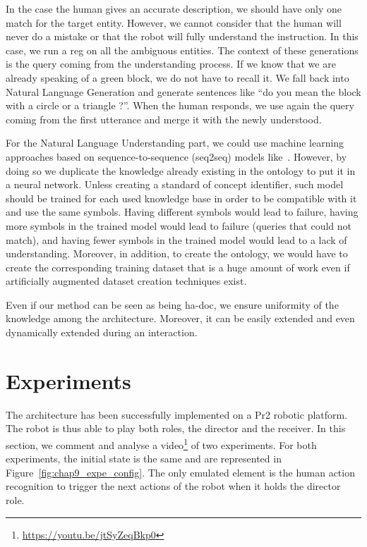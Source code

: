 In the case the human gives an accurate description, we should have only one match for the target entity. However, we cannot consider that the human will never do a mistake or that the robot will fully understand the instruction. In this case, we run a \acrshort{reg} on all the ambiguous entities. The context of these generations is the \sparql{} query coming from the understanding process. If we know that we are already speaking of a green block, we do not have to recall it. We fall back into Natural Language Generation and generate sentences like ``do you mean the block with a circle or a triangle ?''. When the human responds, we use again the \sparql{} query coming from the first utterance and merge it with the newly understood.

For the Natural Language Understanding part, we could use machine learning approaches based on sequence-to-sequence (seq2seq) models like~\cite{panchbhai_2020_exploring}. However, by doing so we duplicate the knowledge already existing in the ontology to put it in a neural network. Unless creating a standard of concept identifier, such model should be trained for each used knowledge base in order to be compatible with it and use the same symbols. Having different symbols would lead to failure, having more symbols in the trained model would lead to failure (queries that could not match), and having fewer symbols in the trained model would lead to a lack of understanding. Moreover, in addition, to create the ontology, we would have to create the corresponding training dataset that is a huge amount of work even if artificially augmented dataset creation techniques exist.

Even if our method can be seen as being ha-doc, we ensure uniformity of the knowledge among the architecture. Moreover, it can be easily extended and even dynamically extended during an interaction.

\section{Experiments}

The architecture has been successfully implemented on a Pr2 robotic platform. The robot is thus able to play both roles, the director and the receiver. In this section, we comment and analyse a video\footnote{\url{https://youtu.be/jtSyZeqBkp0}} of two experiments. For both experiments, the initial state is the same and are represented in Figure~\ref{fig:chap9_expe_config}. The only emulated element is the human action recognition to trigger the next actions of the robot when it holds the director role.


